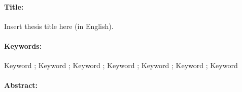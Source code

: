 \begin{mdframed}
\vspace{-.25cm}
\paragraph*{Title:} Insert thesis title here (in English).

\begin{small}
\vspace{-.25cm}
\paragraph*{Keywords:}  Keyword ; Keyword ; Keyword ; Keyword ;  Keyword ; Keyword ; Keyword 

\vspace{-.5cm}
\setlength{\columnsep}{12pt} %
\begin{multicols}{2}
\paragraph*{Abstract:}
\lipsum[1-5]


\end{multicols}
\end{small}
\end{mdframed}
	
\newpage
\thispagestyle{empty}
\mbox{}
\newpage
